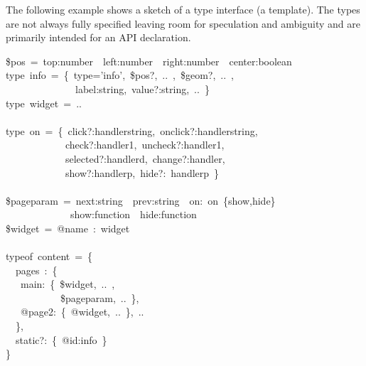 \documentclass{article}
\begin{document}
\noindent{}The following example shows a sketch of a type interface (a template). The types are not always fully specified leaving room for speculation and ambiguity and are primarily intended for an API declaration.%
\begin{mdpre}%
\noindent\$pos~=~top:number~\textbar{}~left:number~\textbar{}~right:number~\textbar{}~center:{boolean}\\
type~info~=~\{~type={'}{info}{'},~\$pos?,~..~,~\$geom?,~..~,\\
~~~~~~~~~~~~~~label:string,~value?:string,~..~\}\\
type~widget~=~..\\
~\\
type~on~=~\{~click?:handler\textbar{}string,~onclick?:handler\textbar{}string,~\\
~~~~~~~~~~~~check?:handler1,~uncheck?:handler1,~\\
~~~~~~~~~~~~selected?:handlerd,~change?:handler,\\
~~~~~~~~~~~~show?:handlerp,~hide?:~handlerp~\}\\
~\\
\$pageparam~=~next:string~\textbar{}~prev:string~\textbar{}~on:~on~\{show,hide\}~\textbar{}~\\
~~~~~~~~~~~~~show:{function}~\textbar{}~hide:{function}\\
\$widget~=~@name~:~widget\\
~\\
{typeof}~content~=~\{\\
~~pages~:~\{~\\
~~~main:~\{~\$widget,~..~,~\\
~~~~~~~~~~~\$pageparam,~..~\},~\\
~~~@page2:~\{~@widget,~..~\},~..\\
~~\},\\
~~{static}?:~\{~@id:info~\}\\
\}%
\end{mdpre}
\end{document}
